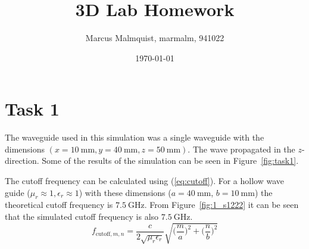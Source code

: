 \documentclass[12pt,a4paper]{article}
\title{3D Lab Homework}
\author{Marcus Malmquist, marmalm, 941022}
\date{\today}
\begin{document}
\maketitle

\section{Task 1}\label{sec:1}
The waveguide used in this simulation was a single waveguide with the dimensions $(x=\SI{10}{\milli\metre}, y=\SI{40}{\milli\metre}, z=\SI{50}{\milli\metre})$. The wave propagated in the $z$-direction. Some of the results of the simulation can be seen in Figure~\ref{fig:task1}.

The cutoff frequency can be calculated using (\ref{eq:cutoff}). For a hollow wave guide ($\mu_r\approx 1, \epsilon_r\approx 1$) with these dimensions ($a=\SI{40}{\milli\metre}$, $b=\SI{10}{\milli\metre}$) the theoretical cutoff frequency is $\SI{7.5}{\giga\hertz}$. From Figure~\ref{fig:1_s1222} it can be seen that the simulated cutoff frequency is also $\SI{7.5}{\giga\hertz}$.
\begin{equation}
  f_{\text{cutoff},m,n}=\frac{c}{2\sqrt{\mu_r\epsilon_r}}\sqrt{\big(\frac{m}{a}\big)^2+\big(\frac{n}{b}\big)^2}
  \label{eq:cutoff}
\end{equation}
\end{document}
